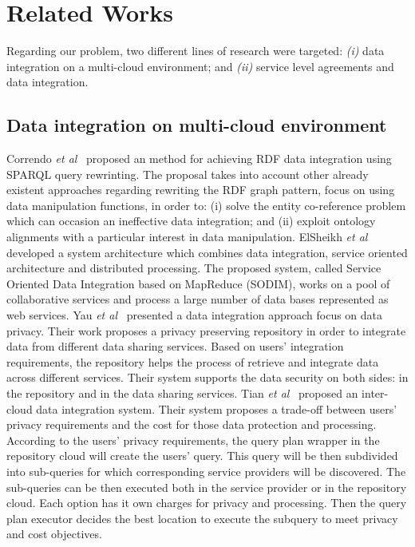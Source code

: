 \section{Related Works}\label{sec:rw}
Regarding our problem, two different lines of research were targeted:
\textit{(i)} data integration on a multi-cloud environment; and
\textit{(ii)} service level agreements and data integration.

\subsection{Data integration on multi-cloud environment}
Correndo \textit{et al}~\cite{075} proposed an method for achieving RDF data integration
using SPARQL query rewrinting. 
The proposal takes into account other already existent approaches regarding rewriting 
the RDF graph pattern, focus on using data manipulation functions, in order to: (i) solve 
the entity co-reference problem which can occasion an ineffective data integration; 
and (ii) exploit ontology alignments with a particular interest in data manipulation. 
ElSheikh \textit{et al}~\cite{078} developed a system architecture which combines data integration,
service oriented architecture and distributed processing. The proposed system, called Service 
Oriented Data Integration based on MapReduce (SODIM), works on a pool of collaborative services and 
process a large number of data bases represented as web services. 
Yau \textit{et al}~\cite{YauY08} presented a data integration approach focus on data privacy.
Their work proposes a privacy preserving repository in order to integrate data from
different data sharing services. 
Based on users' integration requirements, the repository helps the process of retrieve and integrate
data across different services.
Their system supports the data security on both sides: in the repository and in
the data sharing services.
Tian \textit{et al}~\cite{096} proposed an inter-cloud data integration system. 
Their system proposes a trade-off between users' privacy requirements and the
cost for those data protection and processing.
According to the users' privacy requirements, the query plan wrapper in the repository cloud will
create the users' query. This query will be then subdivided into sub-queries for
which corresponding service providers will be discovered. The sub-queries can
be then executed both in the service provider or in the repository cloud.
Each option has it own charges for privacy and processing. 
Then the query plan executor decides the best location to execute the subquery
to meet privacy and cost objectives.

